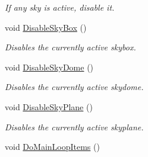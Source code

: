 \begin{DoxyCompactItemize}
\begin{DoxyCompactList}\small\item\em If any sky is active, disable it. \item\end{DoxyCompactList}\item 
void \hyperlink{classphys_1_1SceneManager_acb9c87d510955f028db24ce49944a97a}{DisableSkyBox} ()
\begin{DoxyCompactList}\small\item\em Disables the currently active skybox. \item\end{DoxyCompactList}\item 
void \hyperlink{classphys_1_1SceneManager_a11bf15ca8c7d758ee50e423ad03d2625}{DisableSkyDome} ()
\begin{DoxyCompactList}\small\item\em Disables the currently active skydome. \item\end{DoxyCompactList}\item 
void \hyperlink{classphys_1_1SceneManager_af5763eedafdd11712b55ee33a11bd2b8}{DisableSkyPlane} ()
\begin{DoxyCompactList}\small\item\em Disables the currently active skyplane. \item\end{DoxyCompactList}\item 
\hypertarget{classphys_1_1SceneManager_a27a3f6b21e15f628642b1cad524f1a18}{
void \hyperlink{classphys_1_1SceneManager_a27a3f6b21e15f628642b1cad524f1a18}{DoMainLoopItems} ()}
\label{classphys_1_1SceneManager_a27a3f6b21e15f628642b1cad524f1a18}


\end{DoxyCompactItemize}
